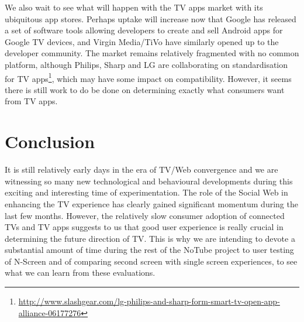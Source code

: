 \documentclass{notube}
\begin{document}
We also wait to see what will happen with the TV apps market with its ubiquitous app stores. Perhaps uptake will increase now that Google has released a set of software tools allowing developers to create and sell Android apps for Google TV devices, and Virgin Media/TiVo have similarly opened up to the developer community. The market remains relatively fragmented with no common platform, although Philips, Sharp and LG are collaborating on standardisation for TV apps\footnote{\url{http://www.slashgear.com/lg-philips-and-sharp-form-smart-tv-open-app-alliance-06177276}}, which may have some impact on compatibility. However, it seems there is still work to do be done on determining exactly what consumers want from TV apps. 

\chapter{Conclusion}

It is still relatively early days in the era of TV/Web convergence and we are witnessing so many new technological and behavioural developments during this exciting and interesting time of experimentation. The role of the Social Web in enhancing the TV experience has clearly gained significant momentum during the last few months. However, the relatively slow consumer adoption of connected TVs and TV apps suggests to us that good user experience is really crucial in determining the future direction of TV. This is why we are intending to devote a substantial amount of time during the rest of the NoTube project to user testing of N-Screen and of comparing second screen with single screen experiences, to see what we can learn from these evaluations.
\end{document}
